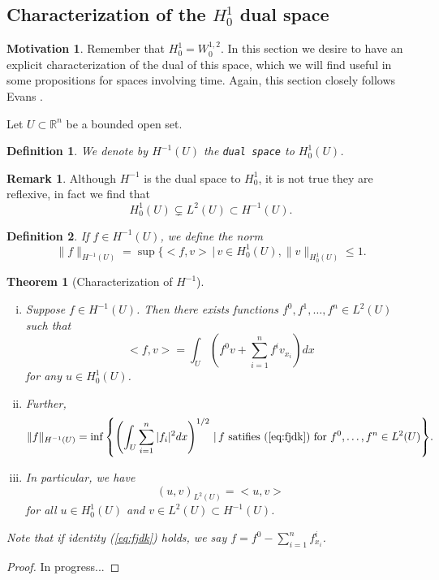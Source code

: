 \documentclass[11pt]{article}
\newtheorem{theorem}{Theorem}
\newtheorem{definition}{Definition}
\theoremstyle{definition}
\newtheorem*{remark}{Remark}
\newtheorem*{motivation}{Motivation}
\begin{document}
\newpage

\subsection{Characterization of the $H_0^1$ dual space}
\begin{motivation}
	Remember that $H_0^1 = W_0^{1,2}$. In this section we desire to have an explicit characterization of the dual of this space,
	which we will find useful in some propositions for spaces involving time. Again, this section closely follows Evans \cite{evans1998partial}.
\end{motivation}
Let $U \subset \mathbb{R}^n$ be a bounded open set.
\begin{definition}
	We denote by $H^{-1}(U)$ the \texttt{dual space} to $H_0^1(U)$.
\end{definition}
\begin{remark}
	Although $H^{-1}$ is the dual space to $H_0^1$, it is not true they are reflexive, in fact we find that
	\begin{equation*}
		H_0^1(U) \subsetneq L^2(U) \subset H^{-1}(U).
	\end{equation*}
\end{remark}

\begin{definition}
	If $f \in H^{-1}(U)$, we define the norm
	\begin{equation*}
		\|f\|_{H^{-1}(U)} = \sup{\{<f,v> \,|\, v\in H_0^1(U), \|v\|_{H_0^1(U)} \leq 1}.
	\end{equation*}
\end{definition}

\begin{theorem}[Characterization of $H^{-1}$]~ 
	\begin{enumerate}[(i)]
		\item Suppose $f\in H^{-1}(U)$. Then there exists functions $f^0,f^1,\dots,f^n \in L^2(U)$ such that
			\begin{equation}
				\label{eq:fjdk}
				<f,v> = \int_U \left(f^0v + \sum_{i=1}^n f^iv_{x_i}\right)dx
			\end{equation}
			for any $u \in H_0^1(U)$.
		\item Further,
			\begin{equation*}
				\|f\|_{H^{-1}(U)} = \inf{\left\{\left(\int_U \sum_{i=1}^n |f_i|^2dx\right)^{1/2} \,|\, f \text{ satifies } (\ref{eq:fjdk}) \text{ for } f^0,\dots,f^n \in L^2(U)\right\}}.
			\end{equation*}
		\item In particular, we have
			\begin{equation}
				(u,v)_{L^2(U)} = <u,v>
			\end{equation}
			for all $u \in H_0^1(U)$ and $v \in L^2(U) \subset H^{-1}(U)$.
	\end{enumerate}
	Note that if identity (\ref{eq:fjdk}) holds, we say $f = f^0 - \sum_{i=1}^n f_{x_i}^i$.
\end{theorem}
\begin{proof}
	In progress...
\end{proof}
\end{document}
